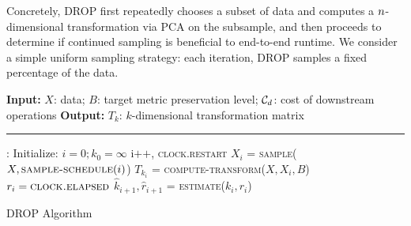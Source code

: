 Concretely, DROP first repeatedly chooses a subset of data and computes a ${\color{black}n}$-dimensional transformation via PCA on the subsample, and then proceeds to determine if continued sampling is beneficial to end-to-end runtime.
We consider a simple uniform sampling strategy: each iteration, DROP samples a fixed percentage of the data.
 
 
 
 
 


\begin{algorithm}[t!]
\begin{algorithmic}[1]
\small
\Statex \textbf{Input:}  $X$: data; $B$: target metric preservation level; $\mathcal{C}_{\color{black}d}$: cost of downstream operations
\Statex \textbf{Output:} $T_k$: $k$-dimensional transformation matrix
\Statex
\Statex \hrule
{}:
	\State Initialize: $i = 0; k_0 = \infty$ 
	\Do
		\State i$\texttt{++}$, \textsc{clock.restart}
		\State $X_i$ = \textsc{sample}($X, \textsc{sample-schedule}(i)$) \label{eq:sample}
			\Comment{\S~\ref{subsec:psample}}
		\State $T_{k_i}$ = \textsc{compute-transform}($X, X_i,  B$) \label{eq:evaluate}
			\Comment{\S~\ref{subsec:teval}}
		\State $r_i = \textsc{clock.elapsed}$	
		\State $\hat{k}_{i+1}, \hat{r}_{i+1} $ = \textsc{estimate}($k_i, r_i$) \label{eq:estimate}
			\Comment{\S~\ref{subsec:pest}}
	 \label{eq:optimize}
		\Comment{\S~\ref{subsec:opt}}
	\\
\EndFunction
\end{algorithmic}
\caption{DROP Algorithm}
\label{alg:DROP}
\end{algorithm}



